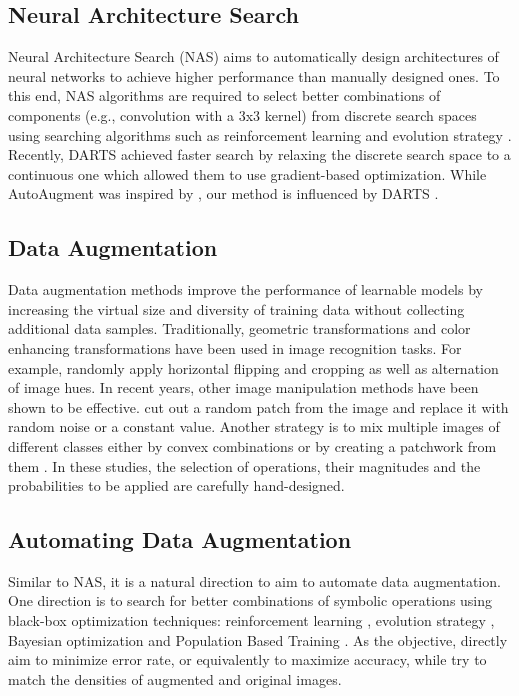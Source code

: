 \documentclass[10pt,twocolumn,letterpaper]{article}
\newcommand{\autoaugment}{AutoAugment\xspace}
\begin{document}
\subsection*{Neural Architecture Search}

Neural Architecture Search (NAS) aims to automatically design architectures of neural networks to achieve higher performance than manually designed ones. To this end, NAS algorithms are required to select better combinations of components (e.g., convolution with a 3x3 kernel) from discrete search spaces using searching algorithms such as reinforcement learning  \cite{Zoph2016b} and evolution strategy \cite{Real2019}. Recently, DARTS \cite{Liu2018c} achieved faster search by relaxing the discrete search space to a continuous one which allowed them to use gradient-based optimization. While \autoaugment \cite{Cubuk2018} was inspired by \cite{Zoph2016b}, our method is influenced by DARTS \cite{Liu2018c}.

\subsection*{Data Augmentation}

Data augmentation methods improve the performance of learnable models by increasing the virtual size and diversity of training data without collecting additional data samples. Traditionally, geometric transformations and color enhancing transformations have been used in image recognition tasks. For example, \cite{Krizhevsky2012,He2016b}  randomly apply horizontal flipping and cropping as well as alternation of image hues. In recent years, other image manipulation methods have been shown to be effective. \cite{zhong2017random, DeVries2017} cut out a random patch from the image and replace it with random noise or a constant value. Another strategy is to mix multiple images of different classes either by convex combinations \cite{Zhang2017c,Tokozume2017b} or by creating a patchwork from them \cite{yun2019cutmix}. In these studies, the selection of operations, their magnitudes and the probabilities to be applied are carefully hand-designed.


\subsection*{Automating Data Augmentation}

Similar to NAS, it is a natural direction to aim to automate data augmentation. One direction is to search for better combinations of symbolic operations using black-box optimization techniques: reinforcement learning \cite{Cubuk2018,Ratner2017a}, evolution strategy \cite{Volpi2018}, Bayesian optimization \cite{Lim2019} and Population Based Training \cite{Ho2019}. As the objective, \cite{Cubuk2018,Volpi2018,Ho2019} directly aim to minimize error rate, or equivalently to maximize accuracy, while \cite{Ratner2017a,Lim2019} try to match the densities of augmented and original images.
\end{document}

